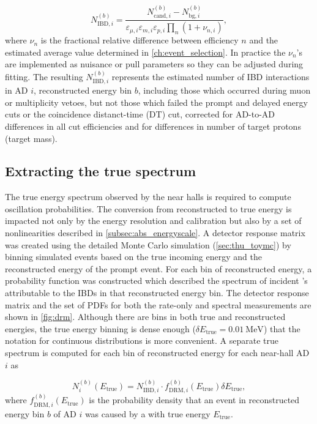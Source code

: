 \begin{equation}\label{eq:near_hall_bg_eff}
    N_{\text{IBD},i}^{(b)} =
    \frac{N_{\text{cand},i}^{(b)} - N_{\text{bg},i}^{(b)}}{
        \varepsilon_{\mu,i}\varepsilon_{m,i}\varepsilon_{p,i}\prod_n(1+\nu_{n,i})
    },
\end{equation}
where $\nu_n$ is the fractional relative difference between efficiency $n$
and the estimated average value determined in \cref{ch:event_selection}.
In practice the $\nu_n$'s are implemented as nuisance or pull parameters
so they can be adjusted during fitting.
The resulting $N_{\text{IBD},i}^{(b)}$ represents
the estimated number of IBD interactions in AD $i$,
reconstructed energy bin $b$,
including those which occurred during muon or multiplicity vetoes,
but not those which failed the prompt and delayed energy cuts
or the coincidence distanct-time (DT) cut,
corrected for AD-to-AD differences in all cut efficiencies
and for differences in number of target protons (target mass).


\subsection{Extracting the true \texorpdfstring{\nuebar{}}{antineutrino} spectrum}
\label{subsec:reco_to_true_energy}

The true \nuebar{} energy spectrum observed by the near halls
is required to compute oscillation probabilities.
The conversion from reconstructed to true energy
is impacted not only by the energy resolution and calibration
but also by a set of nonlinearities described in \cref{subsec:abs_energyscale}.
A detector response matrix was created
using the detailed Monte Carlo simulation (\cref{sec:thu_toymc})
by binning simulated events based on the true incoming \nuebar{} energy
and the reconstructed energy of the prompt event.
For each bin of reconstructed energy,
a probability function was constructed
which described the spectrum of incident \nuebar{}'s
attributable to the IBDs in that reconstructed energy bin.
The detector response matrix and the set of PDFs
for both the rate-only and spectral measurements
are shown in \cref{fig:drm}.
Although there are bins in both true and reconstructed energies,
the true energy binning is dense enough ($\delta E_{\text{true}} = \SI{0.01}{\MeV}$)
that the notation for continuous distributions is more convenient.
A separate true \nuebar{} spectrum is computed
for each bin of reconstructed energy for each near-hall AD $i$ as

\begin{equation}
    N_i^{(b)}(E_{\text{true}}) = N_{\text{IBD},i}^{(b)}
    \cdot f_{\text{DRM},i}^{(b)}(E_{\text{true}}) \delta E_{\text{true}},
\end{equation}
where $f_{\text{DRM},i}^{(b)}(E_{\text{true}})$ is the probability density
that an event in reconstructed energy bin $b$
of AD $i$
was caused by a \nuebar{} with true energy $E_{\text{true}}$.


